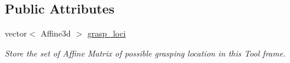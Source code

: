\subsection*{Public Attributes}
\begin{DoxyCompactItemize}
\item 
\mbox{\label{classCreate__Tool_a7302b3e168c45d380194eeed2e863955}} 
vector$<$ Affine3d $>$ \hyperlink{classCreate__Tool_a7302b3e168c45d380194eeed2e863955}{grasp\+\_\+loci}
\begin{DoxyCompactList}\small\item\em Store the set of Affine Matrix of possible grasping location in this Tool frame. \end{DoxyCompactList}\end{DoxyCompactItemize}
